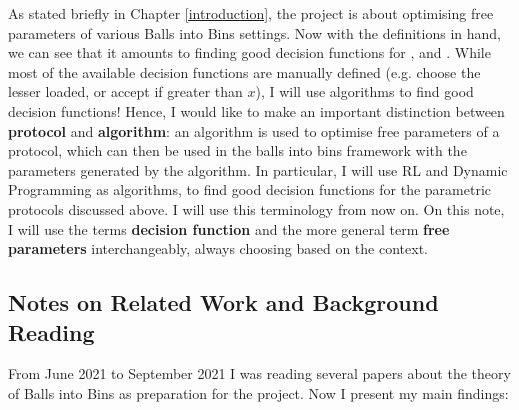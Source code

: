 As stated briefly in Chapter \ref{introduction}, the project is about optimising free parameters of various Balls into Bins settings. Now with the definitions in hand, we can see that it amounts to finding good decision functions for \TwoThinning, \KThinning and \GraphicalTwoChoice. While most of the available decision functions are manually defined (e.g. choose the lesser loaded, or accept if greater than $x$), I will use algorithms to find good decision functions! Hence, I would like to make an important distinction between \textbf{protocol} and \textbf{algorithm}: an algorithm is used to optimise free parameters of a protocol, which can then be used in the balls into bins framework with the parameters generated by the algorithm. In particular, I will use RL and Dynamic Programming as algorithms, to find good decision functions for the parametric protocols discussed above. I will use this terminology from now on. On this note, I will use the terms \textbf{decision function} and the more general term \textbf{free parameters} interchangeably, always choosing based on the context. 


\subsection{Notes on Related Work and Background Reading}


From June 2021 to September 2021  I was reading several papers about the theory of Balls into Bins as preparation for the project. Now I present my main findings: 


